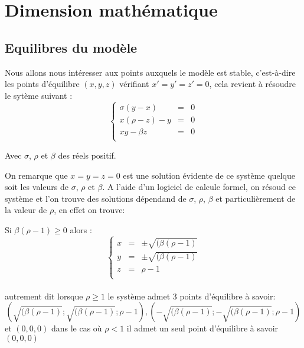 \section{Dimension mathématique}

\subsection{Equilibres du modèle}
Nous allons nous intéresser aux points auxquels le modèle est stable, c’est-à-dire les points d’équilibre $(x,y,z)$ vérifiant $x'=y'=z'=0$, cela revient à résoudre le sytème suivant :
\[
    \left\{
    \begin{array}{rcl}
        \sigma(y-x)&=&0\\
        x(\rho-z)-y&=&0\\
        xy-\beta z&=&0\\
    \end{array}
    \right.
\]

Avec $\sigma$, $\rho$ et $\beta$ des réels positif.

On remarque que $x=y=z=0$ est une solution évidente de ce système quelque soit les valeurs de $\sigma$, $\rho$ et $\beta$. A l'aide d'un logiciel de calcule formel, on résoud ce système et l'on trouve des solutions dépendand de $\sigma$, $\rho$, $\beta$ et particulièrement de la valeur de $\rho$, en effet on trouve:

Si $\beta(\rho-1)\geq 0$ alors :
\[
    \left\{
    \begin{array}{rcl}
        x&=& \pm \sqrt{(\beta(\rho-1)}\\
        y&=& \pm \sqrt{(\beta(\rho-1)}\\
        z&=&\rho-1\\
    \end{array}
    \right.
\]\\
autrement dit lorsque $\rho\geq 1$ le système admet 3 points d'équilibre à savoir:
$$(\sqrt{(\beta(\rho-1)}; \sqrt{(\beta(\rho-1)}; \rho-1), (-\sqrt{(\beta(\rho-1)}; -\sqrt{(\beta(\rho-1)}; \rho-1)$$
et $(0,0,0)$ dans le cas où $\rho < 1$ il admet un seul point d'équilibre à savoir $(0,0,0)$
 
